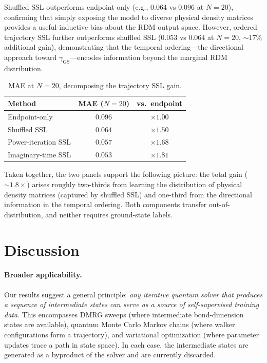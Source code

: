 \documentclass[12pt]{article}
\newcommand{\gGS}{\gamma_{\mathrm{GS}}}
\begin{document}
Shuffled SSL outperforms endpoint-only (e.g., $0.064$ vs $0.096$ at $N=20$),
confirming that simply exposing the model to diverse physical density matrices
provides a useful inductive bias about the RDM output space.
However, ordered trajectory SSL further outperforms shuffled SSL
($0.053$ vs $0.064$ at $N=20$, $\sim\!17\%$ additional gain),
demonstrating that the temporal ordering---the directional approach toward
$\gGS$---encodes information beyond the marginal RDM distribution.

\begin{table}[h]
\centering
\small
\caption{MAE at $N=20$, decomposing the trajectory SSL gain.}
\label{tab:mechanism}
\begin{tabular}{lcc}
\toprule
Method & MAE ($N=20$) & vs.\ endpoint \\
\midrule
Endpoint-only        & $0.096$ & $\times 1.00$ \\
Shuffled SSL         & $0.064$ & $\times 1.50$ \\
Power-iteration SSL  & $0.057$ & $\times 1.68$ \\
Imaginary-time SSL   & $0.053$ & $\times 1.81$ \\
\bottomrule
\end{tabular}
\end{table}

Taken together, the two panels support the following picture:
the total gain (${\sim}1.8\times$) arises roughly two-thirds from
learning the distribution of physical density matrices (captured by shuffled SSL)
and one-third from the directional information in the temporal ordering.
Both components transfer out-of-distribution, and neither requires ground-state labels.

\section{Discussion}
\label{sec:discussion}

\paragraph{Broader applicability.}
Our results suggest a general principle: \emph{any iterative quantum solver that
produces a sequence of intermediate states can serve as a source of self-supervised
training data}.
This encompasses DMRG sweeps (where intermediate bond-dimension states are available),
quantum Monte Carlo Markov chains (where walker configurations form a trajectory),
and variational optimization (where parameter updates trace a path in state space).
In each case, the intermediate states are generated as a byproduct of the solver
and are currently discarded.
\end{document}
